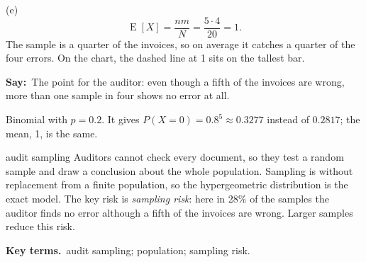 \documentclass[11pt,a4paper,parskip=half]{scrartcl}
\newcommand{\E}{\operatorname{E}}
\newcommand{\terms}{\par\textbf{\color{plum}Key terms.}\ }
\newcommand{\say}{\textbf{\color{teal}Say:}\ }
\begin{document}
(e)
\[ \E[X]=\frac{nm}{N}=\frac{5\cdot4}{20}=1. \]
The sample is a quarter of the invoices, so on average it catches a
quarter of the four errors. On the chart, the dashed line at 1 sits on
the tallest bar.

\say The point for the auditor: even though a fifth of the invoices are
wrong, more than one sample in four shows no error at all.

\begin{mistake}
	Binomial with $p=0.2$. It gives $P(X=0)=0.8^5\approx0.3277$ instead of
	$0.2817$; the mean, 1, is the same.
\end{mistake}

\begin{bg}{audit sampling}
	Auditors cannot check every document, so they test a random sample and
	draw a conclusion about the whole population. Sampling is without
	replacement from a finite population, so the hypergeometric distribution
	is the exact model. The key risk is \emph{sampling risk}: here in 28\% of
	the samples the auditor finds no error although a fifth of the invoices
	are wrong. Larger samples reduce this risk.

	\terms audit sampling; population; sampling risk.
\end{bg}

\needspace{0.25\textheight}
\end{document}
